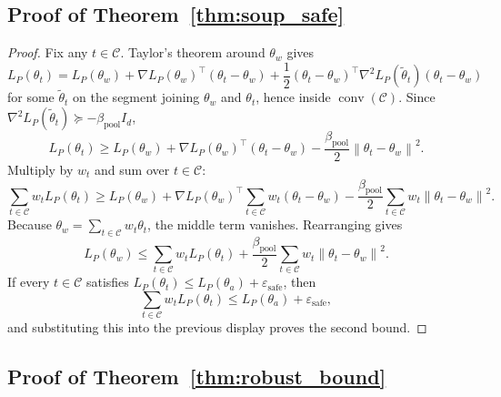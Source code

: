 \documentclass{article}
\newcommand{\cC}{\mathcal{C}}
\newcommand{\norm}[1]{\left\lVert #1 \right\rVert}
\begin{document}
\subsection{Proof of Theorem~\ref{thm:soup_safe}}

\begin{proof}
Fix any \(t\in\cC\). Taylor's theorem around \(\theta_w\) gives
\[
L_P(\theta_t)
=
L_P(\theta_w)
+
\nabla L_P(\theta_w)^\top (\theta_t-\theta_w)
+
\frac12 (\theta_t-\theta_w)^\top \nabla^2 L_P(\tilde\theta_t)(\theta_t-\theta_w)
\]
for some \(\tilde\theta_t\) on the segment joining \(\theta_w\) and \(\theta_t\), hence inside \(\operatorname{conv}(\cC)\). Since \(\nabla^2 L_P(\tilde\theta_t)\succeq -\beta_{\mathrm{pool}}I_d\),
\[
L_P(\theta_t)
\ge
L_P(\theta_w)
+
\nabla L_P(\theta_w)^\top (\theta_t-\theta_w)
-
\frac{\beta_{\mathrm{pool}}}{2}\norm{\theta_t-\theta_w}^2.
\]
Multiply by \(w_t\) and sum over \(t\in\cC\):
\[
\sum_{t\in\cC} w_t L_P(\theta_t)
\ge
L_P(\theta_w)
+
\nabla L_P(\theta_w)^\top \sum_{t\in\cC} w_t(\theta_t-\theta_w)
-
\frac{\beta_{\mathrm{pool}}}{2}
\sum_{t\in\cC} w_t \norm{\theta_t-\theta_w}^2.
\]
Because \(\theta_w=\sum_{t\in\cC} w_t\theta_t\), the middle term vanishes. Rearranging gives
\[
L_P(\theta_w)
\le
\sum_{t\in\cC} w_t L_P(\theta_t)
+
\frac{\beta_{\mathrm{pool}}}{2}
\sum_{t\in\cC} w_t \norm{\theta_t-\theta_w}^2.
\]
If every \(t\in\cC\) satisfies \(L_P(\theta_t)\le L_P(\theta_a)+\varepsilon_{\mathrm{safe}}\), then
\[
\sum_{t\in\cC} w_t L_P(\theta_t)\le L_P(\theta_a)+\varepsilon_{\mathrm{safe}},
\]
and substituting this into the previous display proves the second bound.
\end{proof}

\subsection{Proof of Theorem~\ref{thm:robust_bound}}
\end{document}
